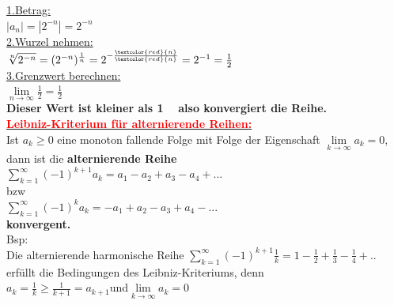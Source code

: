 \documentclass[12pt,a4paper]{article}
\begin{document}
\underline{1.Betrag:}\\
$|a_n|=|2^{-n}|=2^{-n}$\\
\underline{2.Wurzel nehmen:}\\
$\sqrt[n]{2^{-n}}=(2^{-n})^\frac{1}{n}=2^{-\frac{\textcolor{red}{n}}{\textcolor{red}{n}}}=2^{-1}=\frac{1}{2}$\\
\underline{3.Grenzwert berechnen:}\\
$\lim\limits_{n\rightarrow\infty}\frac{1}{2}=\frac{1}{2}$\\
\textbf{Dieser Wert ist kleiner als 1 ~ also konvergiert die Reihe.}\\
\underline{\textbf{\textcolor{red}{Leibniz-Kriterium für alternierende Reihen:}}}\\
Ist $a_k\geq 0$ eine monoton fallende Folge mit Folge der Eigenschaft $\lim\limits_{k\rightarrow\infty}a_k=0$, dann ist die \textbf{alternierende Reihe}\\
$\sum\limits_{k=1}^{\infty}(-1)^{k+1}a_k=a_1-a_2+a_3-a_4+...$\\
bzw\\
$\sum\limits_{k=1}^{\infty}(-1)^{k}a_k=-a_1+a_2-a_3+a_4-...$\\
\textbf{konvergent.}\\
Bsp:\\
Die alternierende harmonische Reihe $\sum\limits_{k=1}^{\infty}(-1)^{k+1}\frac{1}{k}=1-\frac{1}{2}+\frac{1}{3}-\frac{1}{4}+..$\\
erfüllt die Bedingungen des Leibniz-Kriteriums, denn\\
$a_k=\frac{1}{k}\geq \frac{1}{k+1}=a_{k+1}$und$\lim\limits_{k\rightarrow\infty}a_k=0$\\
\end{document}
